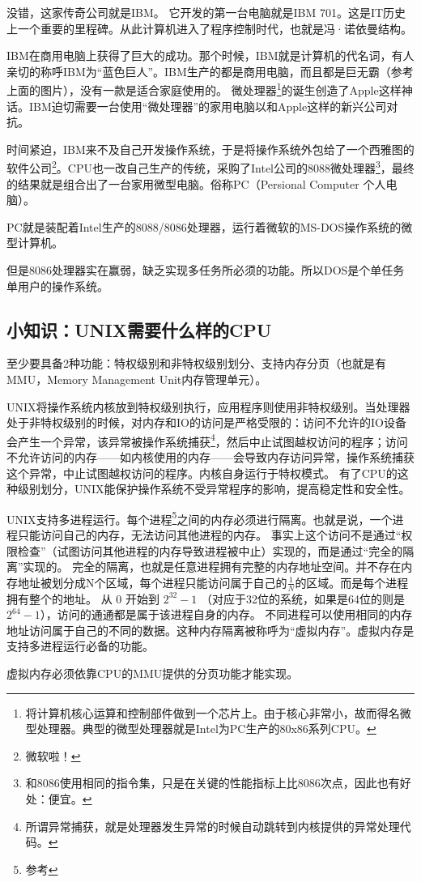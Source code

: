 没错，这家传奇公司就是IBM。
它开发的第一台电脑就是IBM 701。这是IT历史上一个重要的里程碑。从此计算机进入了程序控制时代，也就是冯·诺依曼结构。

IBM在商用电脑上获得了巨大的成功。那个时候，IBM就是计算机的代名词，有人亲切的称呼IBM为“蓝色巨人”。IBM生产的都是商用电脑，而且都是巨无霸（参考上面的图片），没有一款是适合家庭使用的。
微处理器\footnote{将计算机核心运算和控制部件做到一个芯片上。由于核心非常小，故而得名微型处理器。典型的微型处理器就是Intel为PC生产的80x86系列CPU。}的诞生创造了Apple这样神话。IBM迫切需要一台使用“微处理器”的家用电脑以和Apple这样的新兴公司对抗。

时间紧迫，IBM来不及自己开发操作系统，于是将操作系统外包给了一个西雅图的软件公司\footnote{微软啦！}。CPU也一改自己生产的传统，采购了Intel公司的8088微处理器\footnote{和8086使用相同的指令集，只是在关键的性能指标上比8086次点，因此也有好处：便宜。}，最终的结果就是组合出了一台家用微型电脑。俗称PC（Persional Computer 个人电脑）。

PC就是装配着Intel生产的8088/8086处理器，运行着微软的MS-DOS操作系统的微型计算机。

但是8086处理器实在赢弱，缺乏实现多任务所必须的功能。所以DOS是个单任务单用户的操作系统。

\begin{insertnote}
\subsection*{小知识：UNIX需要什么样的CPU}
至少要具备2种功能：特权级别和非特权级别划分、支持内存分页（也就是有MMU，Memory Management Unit内存管理单元）。

UNIX将操作系统内核放到特权级别执行，应用程序则使用非特权级别。当处理器处于非特权级别的时候，对内存和IO的访问是严格受限的：访问不允许的IO设备会产生一个异常，该异常被操作系统捕获\footnote{所谓异常捕获，就是处理器发生异常的时候自动跳转到内核提供的异常处理代码。}，然后中止试图越权访问的程序；访问不允许访问的内存——如内核使用的内存——会导致内存访问异常，操作系统捕获这个异常，中止试图越权访问的程序。内核自身运行于特权模式。
有了CPU的这种级别划分，UNIX能保护操作系统不受异常程序的影响，提高稳定性和安全性。

UNIX支持多进程运行。每个进程\footnote{参考 }之间的内存必须进行隔离。也就是说，一个进程只能访问自己的内存，无法访问其他进程的内存。
事实上这个访问不是通过“权限检查”（试图访问其他进程的内存导致进程被中止）实现的，而是通过“完全的隔离”实现的。
完全的隔离，也就是任意进程拥有完整的内存地址空间。并不存在内存地址被划分成N个区域，每个进程只能访问属于自己的$ \frac{1}{N}$的区域。而是每个进程拥有整个的地址。
从 0 开始到 $2^{32}-1$ （对应于32位的系统，如果是64位的则是 $2^{64} - 1$），访问的通通都是属于该进程自身的内存。
不同进程可以使用相同的内存地址访问属于自己的不同的数据。这种内存隔离被称呼为“虚拟内存”。虚拟内存是支持多进程运行必备的功能。

虚拟内存必须依靠CPU的MMU提供的分页功能才能实现。
\end{insertnote}

